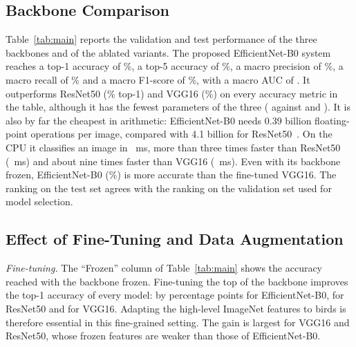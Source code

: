 \documentclass[conference]{IEEEtran}
\begin{document}
\subsection{Backbone Comparison}
Table~\ref{tab:main} reports the validation and test performance of the three
backbones and of the ablated variants. The proposed EfficientNet-B0 system reaches
a top-1 accuracy of \EffNetTopOne\%, a top-5 accuracy of \EffNetTopFive\%, a macro
precision of \EffNetMacroP\%, a macro recall of \EffNetMacroR\% and a macro
F1-score of \EffNetMacroF\%, with a macro AUC of \EffNetAUC. It outperforms
ResNet50 (\ResNetTopOne\% top-1) and VGG16 (\VggTopOne\%) on every accuracy metric
in the table, although it has the fewest parameters of the three (\EffNetParams{} against \ResNetParams{}
and \VggParams). It is also by far the cheapest in arithmetic: EfficientNet-B0
needs 0.39 billion floating-point operations per image, compared with 4.1 billion
for ResNet50~\cite{tan2019}. On the CPU it classifies an image in \EffNetLatency{}~ms,
more than three times faster than ResNet50 (\ResNetLatency{}~ms) and about nine
times faster than VGG16 (\VggLatency{}~ms). Even with its backbone frozen,
EfficientNet-B0 (\EffNetTopOneFrozen\%) is more accurate than the fine-tuned VGG16.
The ranking on the test set agrees with the ranking on the validation set used for
model selection.

\subsection{Effect of Fine-Tuning and Data Augmentation}
\emph{Fine-tuning.} The ``Frozen'' column of Table~\ref{tab:main} shows the
accuracy reached with the backbone frozen. Fine-tuning the top of the backbone
improves the top-1 accuracy of every model: by \FineTuneGain{} percentage points
for EfficientNet-B0, \FineTuneGainResNet{} for ResNet50 and \FineTuneGainVgg{} for
VGG16. Adapting the high-level ImageNet features to birds is therefore essential
in this fine-grained setting. The gain is largest for VGG16 and ResNet50, whose
frozen features are weaker than those of EfficientNet-B0.
\end{document}
